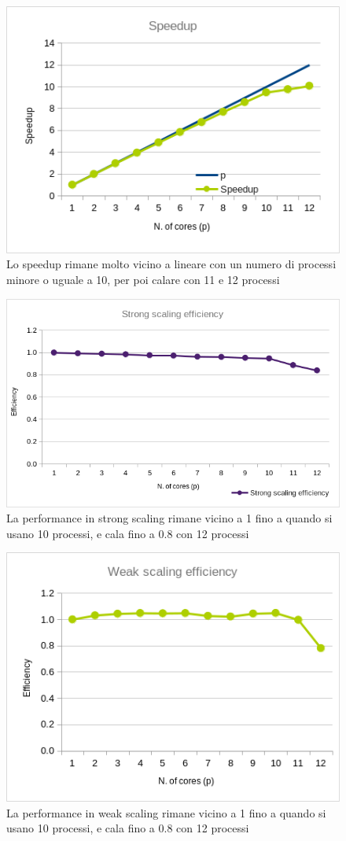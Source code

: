 \documentclass[a4paper,11pt, twoside]{report}
\begin{document}
\begin{figure}[H]
    \includegraphics[scale=0.5]{images/mpi_speedup.png}
    \caption[]{Lo speedup rimane molto vicino a lineare con un numero di processi minore o uguale a 10, per poi calare con 11 e 12 processi}
\end{figure}
\begin{figure}[H]
    \includegraphics[scale=0.5]{images/mpi_strong.png}
    \caption[short]{La performance in strong scaling rimane vicino a 1 fino a quando si usano 10 processi, e cala fino a 0.8 con 12 processi}
\end{figure}
\begin{figure}[H]
    \includegraphics[scale=0.5]{images/mpi_weak.png}
    \caption[short]{La performance in weak scaling rimane vicino a 1 fino a quando si usano 10 processi, e cala fino a 0.8 con 12 processi}
\end{figure}
\end{document}
